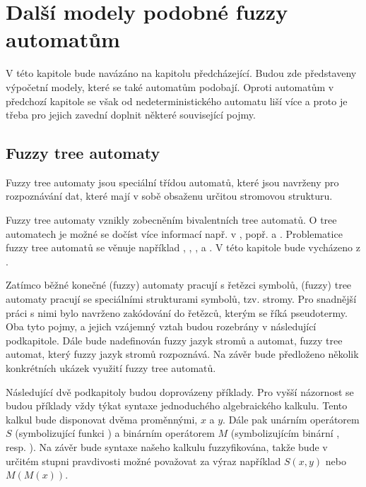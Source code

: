 \documentclass[a4paper,10pt]{article}
\begin{document}
\section{Další modely podobné fuzzy automatům}
V této kapitole bude navázáno na kapitolu předcházející. Budou zde představeny výpočetní modely, které se také automatům podobají. Oproti automatům v předchozí kapitole se však od  nedeterministického automatu liší více a proto je třeba pro jejich zavední doplnit některé související pojmy. 


\subsection{Fuzzy tree automaty}
Fuzzy tree automaty jsou speciální třídou automatů, které jsou navrženy pro rozpoznávání dat, které mají v sobě obsaženu určitou stromovou strukturu.

Fuzzy tree automaty vznikly zobecněním  bivalentních tree automatů. O  tree automatech je možné se dočíst více informací např. v \cite{Com+-TreeAutTecApp}, popř. \cite{Hua-SyntPattRecSeisOilExp} a \cite{Bez+-FuzModAlgPatRecImProc}. Problematice fuzzy tree automatů se věnuje například \cite{Lee-FuzTreAutSynPatRec}, \cite{MogZadAme-NewDirInFuzzTreeAut}, \cite{ChaJos-NoteFuzzTreeAut}, \cite{EsiLiu-FuzzTreeAut} a \cite{MorMal-FuzzyAutLang}. V této kapitole bude vycházeno z \cite{MorMal-FuzzyAutLang}.

Zatímco běžné konečné (fuzzy) automaty pracují s řetězci symbolů, (fuzzy) tree automaty pracují se speciálními strukturami symbolů, tzv. stromy. Pro snadnější práci s nimi bylo navrženo zakódování do řetězců, kterým se říká pseudotermy. Oba tyto pojmy, a jejich vzájemný vztah budou rozebrány v následující podkapitole. Dále bude nadefinován fuzzy jazyk stromů a automat, fuzzy tree automat, který fuzzy jazyk stromů rozpoznává. Na závěr bude předloženo několik konkrétních ukázek využití fuzzy tree automatů.

Následující dvě podkapitoly budou doprovázeny příklady. Pro vyšší názornost se budou příklady vždy týkat syntaxe jednoduchého algebraického kalkulu. Tento kalkul bude disponovat dvěma proměnnými, $x$ a $y$. Dále pak unárním operátorem $S$ (symbolizující funkci ) a binárním operátorem $M$ (symbolizujícím binární , resp. ). Na závěr bude syntaxe našeho kalkulu fuzzyfikována, takže bude v určitém stupni pravdivosti možné považovat za výraz například $S(x, y)$ nebo $M(M(x))$.
\end{document}

